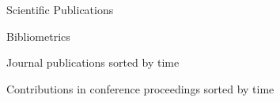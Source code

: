\documentclass{resume} %
\begin{document}


    \begin{rSection}{Scientific Publications}


        \begin{rNoListSubsection}{Bibliometrics}{}{}{}
            
        \end{rNoListSubsection}

        \newpage


        \setlength{} %

        \begin{rNoListSubsection}{Journal publications sorted by time}{}{}{}
            \nocite{*}
            \printbibliography[type=article,heading=none,omitnumbers=true]{}
        \end{rNoListSubsection}


        \begin{rNoListSubsection}{Contributions in conference proceedings sorted by time}{}{}{}
            \nocite{*}
            \printbibliography[filter=conferences,heading=none,omitnumbers=true]{}
        \end{rNoListSubsection}


\end{rSection}
\end{document}
